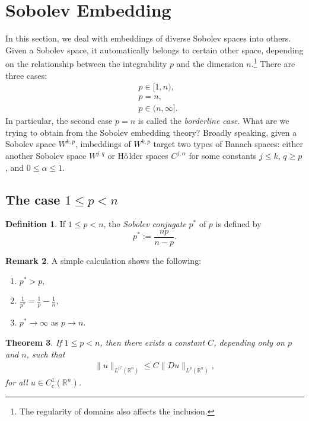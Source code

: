\documentclass[11pt,a4paper]{report}
\newtheorem{theorem}{Theorem}[section]
\theoremstyle{definition}
\newtheorem{definition}[theorem]{Definition}
\newtheorem{remark}[theorem]{Remark}
\begin{document}
\section{Sobolev Embedding}

In this section, we deal with embeddings of diverse Sobolev spaces into others.
Given a Sobolev space, it automatically belongs to certain other space, depending on the relationship between the integrability $p$ and the dimension $n$.\footnote{The regularity of domains also affects the inclusion.}
There are three cases:
\begin{align*}
    &p \in [1, n), \\
    &p = n, \\
    &p \in (n, \infty].
\end{align*}
In particular, the second case $p = n$ is called the \emph{borderline case}. 
What are we trying to obtain from the Sobolev embedding theory?
Broadly speaking, given a Sobolev space $W^{k, p}$, imbeddings of $W^{k, p}$ target two types of Banach spaces: either another Sobolev space $W^{j, q}$ or H$\ddot{\rm o}$lder spaces $C^{j, \alpha}$ for some constants $j \leq k$, $q \geq p$, and $0 \leq \alpha \leq 1$.

\subsection{The case $1 \leq p < n$}

\begin{definition}
    If $1 \leq p < n$, the \emph{Sobolev conjugate} $p^{\ast}$ of $p$ is defined by 
    \begin{equation*} 
        p^{\ast} := \frac{np}{n-p}.
    \end{equation*}
\end{definition}

\begin{remark}
    A simple calculation shows the following:
    \begin{enumerate}[label=(\roman*)] 
    \rm\item $p^{\ast} > p$,
    \rm\item $\displaystyle \frac{1}{p^{\ast}} = \frac{1}{p} - \frac{1}{n}$,
    \rm\item $p^{\ast} \to \infty$ as $p \to n$.
    \end{enumerate}
\end{remark}

\begin{theorem}
    If $1 \leq p < n$, then there exists a constant $C$, depending only on $p$ and $n$, such that
    \begin{align*}
    \|u\|_{L^{p^*}\left(\mathbb{R}^n\right)} \leq C\|D u\|_{L^p\left(\mathbb{R}^n\right)},
    \end{align*}
    for all $u \in C_c^1\left(\mathbb{R}^n\right)$.
\end{theorem}
\end{document}
